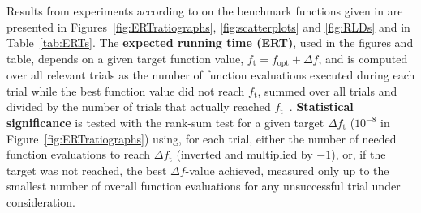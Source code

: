 \documentclass{sig-alternate}
\newcommand{\Df}{\ensuremath{\Delta f}}
\newcommand{\fopt}{\ensuremath{f_\mathrm{opt}}}
\newcommand{\ftarget}{\ensuremath{f_\mathrm{t}}}
\begin{document}
Results from experiments according to \cite{hansen2010exp} on the benchmark
functions given in \cite{wp200901_2010,hansen2010fun} are presented in
Figures~\ref{fig:ERTratiographs}, \ref{fig:scatterplots} and \ref{fig:RLDs} and
in Table~\ref{tab:ERTs}. The \textbf{expected running time (ERT)}, used in the figures and table, depends on a
given target function value, $\ftarget=\fopt+\Df$, and is computed over all relevant trials
as the number of function evaluations executed during each trial while the best
function value did not reach \ftarget, summed over all trials
and divided by the number of trials that actually reached \ftarget\
\cite{hansen2010exp,price1997dev}. 
\textbf{Statistical significance} is tested with the rank-sum test for a given
target $\Delta\ftarget$ ($10^{-8}$ in Figure~\ref{fig:ERTratiographs}) using,
for each trial, either the number of needed function evaluations to reach
$\Delta\ftarget$ (inverted and multiplied by $-1$), or, if the target was not
reached, the best $\Df$-value achieved, measured only up to the smallest number
of overall function evaluations for any unsuccessful trial under consideration. 
\end{document}
